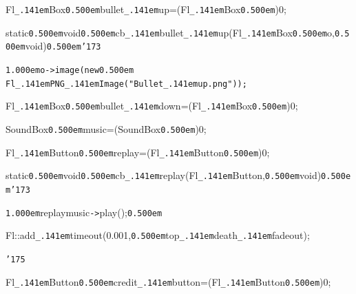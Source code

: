 \documentclass[12pt]{article}
\begin{document}
\noindent
\tt{}

\noindent
{}\hfill

\noindent
{}Fl{\tt\_\kern.141em}Box{\tt\mc \kern0.500em}{\tt *}bullet{\tt\_\kern.141em}up=(Fl{\tt\_\kern.141em}Box{\tt\mc \kern0.500em}{\tt *})0;

\noindent
{}\hfill

\noindent
{}static{\tt\mc \kern0.500em}void{\tt\mc \kern0.500em}cb{\tt\_\kern.141em}bullet{\tt\_\kern.141em}up(Fl{\tt\_\kern.141em}Box{\tt *}{\tt\mc \kern0.500em}o,{\tt\mc \kern0.500em}void{\tt *}){\tt\mc \kern0.500em}{\tt\char'173}

\noindent
{}{\tt\mc \kern1.000em}\tt\mc {\tt /}{\tt /}o{\tt -}{\tt >}image(new\kern0.500em Fl{\tt\_\kern.141em}PNG{\tt\_\kern.141em}Image({\tt "}Bullet{\tt\_\kern.141em}up.png{\tt "}));

\noindent
\tt{}

\noindent
{}\hfill

\noindent
{}Fl{\tt\_\kern.141em}Box{\tt\mc \kern0.500em}{\tt *}bullet{\tt\_\kern.141em}down=(Fl{\tt\_\kern.141em}Box{\tt\mc \kern0.500em}{\tt *})0;

\noindent
{}\hfill

\noindent
{}SoundBox{\tt\mc \kern0.500em}{\tt *}music=(SoundBox{\tt\mc \kern0.500em}{\tt *})0;

\noindent
{}\hfill

\noindent
{}Fl{\tt\_\kern.141em}Button{\tt\mc \kern0.500em}{\tt *}replay=(Fl{\tt\_\kern.141em}Button{\tt\mc \kern0.500em}{\tt *})0;

\noindent
{}\hfill

\noindent
{}static{\tt\mc \kern0.500em}void{\tt\mc \kern0.500em}cb{\tt\_\kern.141em}replay(Fl{\tt\_\kern.141em}Button{\tt *},{\tt\mc \kern0.500em}void{\tt *}){\tt\mc \kern0.500em}{\tt\char'173}

\noindent
{}{\tt\mc \kern1.000em}replaymusic{\tt -}{\tt >}play();{\tt\mc \kern0.500em}

\noindent
{}Fl::add{\tt\_\kern.141em}timeout(0.001,{\tt\mc \kern0.500em}top{\tt\_\kern.141em}death{\tt\_\kern.141em}fadeout);

\noindent
{}{\tt\char'175}

\noindent
{}\hfill

\noindent
{}Fl{\tt\_\kern.141em}Button{\tt\mc \kern0.500em}{\tt *}credit{\tt\_\kern.141em}button=(Fl{\tt\_\kern.141em}Button{\tt\mc \kern0.500em}{\tt *})0;

\noindent
{}\hfill
\end{document}
